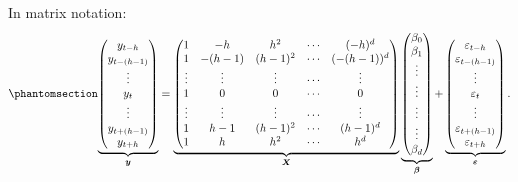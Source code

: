 \documentclass[
]{article}
\newcommand\1{\mathds{1}}
\begin{document}
In matrix notation: \begin{equation}\phantomsection\label{eq-lpp}{
\underbrace{\begin{pmatrix}y_{t-h}\\
y_{t-(h-1)}\\
\vdots\\
y_{t}\\
\vdots\\
y_{t+(h-1)}\\
y_{t+h}
\end{pmatrix}}_{\boldsymbol y}=\underbrace{\begin{pmatrix}1 & -h & h^{2} & \cdots & (-h)^{d}\\
1 & -(h-1) & (h-1)^{2} & \cdots & (-(h-1))^{d}\\
\vdots & \vdots & \vdots & \cdots & \vdots\\
1 & 0 & 0 & \cdots & 0\\
\vdots & \vdots & \vdots & \cdots & \vdots\\
1 & h-1 & (h-1)^{2} & \cdots & (h-1)^{d}\\
1 & h & h^{2} & \cdots & h^{d}
\end{pmatrix}}_{\boldsymbol X}\underbrace{\begin{pmatrix}\beta_{0}\\
\beta_{1}\\
\vdots\\
\vdots\\
\vdots\\
\vdots\\
\beta_{d}
\end{pmatrix}}_{\boldsymbol \beta}+\underbrace{\begin{pmatrix}\varepsilon_{t-h}\\
\varepsilon_{t-(h-1)}\\
\vdots\\
\varepsilon_{t}\\
\vdots\\
\varepsilon_{t+(h-1)}\\
\varepsilon_{t+h}
\end{pmatrix}}_{\boldsymbol \varepsilon}.
}\end{equation}
\end{document}
